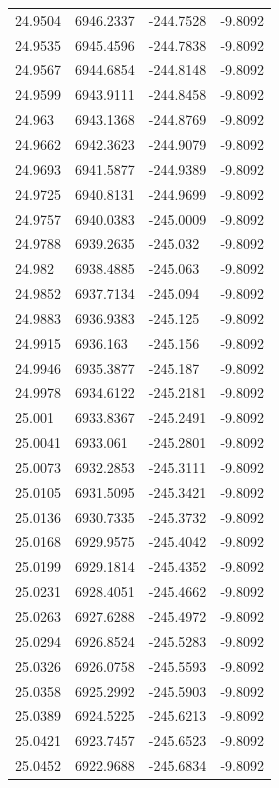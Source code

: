 \begin{table}[H]
\begin{tabular}{llll}
24.9504 & 6946.2337 & -244.7528 & -9.8092 \\
24.9535 & 6945.4596 & -244.7838 & -9.8092 \\
24.9567 & 6944.6854 & -244.8148 & -9.8092 \\
24.9599 & 6943.9111 & -244.8458 & -9.8092 \\
24.963 & 6943.1368 & -244.8769 & -9.8092 \\
24.9662 & 6942.3623 & -244.9079 & -9.8092 \\
24.9693 & 6941.5877 & -244.9389 & -9.8092 \\
24.9725 & 6940.8131 & -244.9699 & -9.8092 \\
24.9757 & 6940.0383 & -245.0009 & -9.8092 \\
24.9788 & 6939.2635 & -245.032 & -9.8092 \\
24.982 & 6938.4885 & -245.063 & -9.8092 \\
24.9852 & 6937.7134 & -245.094 & -9.8092 \\
24.9883 & 6936.9383 & -245.125 & -9.8092 \\
24.9915 & 6936.163 & -245.156 & -9.8092 \\
24.9946 & 6935.3877 & -245.187 & -9.8092 \\
24.9978 & 6934.6122 & -245.2181 & -9.8092 \\
25.001 & 6933.8367 & -245.2491 & -9.8092 \\
25.0041 & 6933.061 & -245.2801 & -9.8092 \\
25.0073 & 6932.2853 & -245.3111 & -9.8092 \\
25.0105 & 6931.5095 & -245.3421 & -9.8092 \\
25.0136 & 6930.7335 & -245.3732 & -9.8092 \\
25.0168 & 6929.9575 & -245.4042 & -9.8092 \\
25.0199 & 6929.1814 & -245.4352 & -9.8092 \\
25.0231 & 6928.4051 & -245.4662 & -9.8092 \\
25.0263 & 6927.6288 & -245.4972 & -9.8092 \\
25.0294 & 6926.8524 & -245.5283 & -9.8092 \\
25.0326 & 6926.0758 & -245.5593 & -9.8092 \\
25.0358 & 6925.2992 & -245.5903 & -9.8092 \\
25.0389 & 6924.5225 & -245.6213 & -9.8092 \\
25.0421 & 6923.7457 & -245.6523 & -9.8092 \\
25.0452 & 6922.9688 & -245.6834 & -9.8092 \\

\end{tabular}
\end{table}
